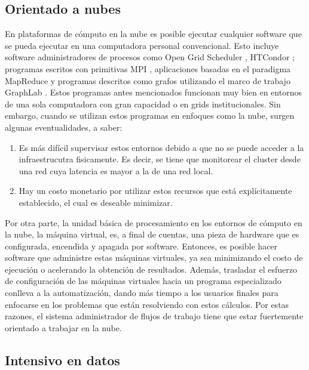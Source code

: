 \subsection{Orientado a nubes}

En plataformas de c\'omputo en la nube es posible ejecutar cualquier software que se pueda ejecutar en una computadora personal convencional. Esto incluye software administradores de procesos como Open Grid Scheduler \cite{univa2016gridengine}, HTCondor \cite{htcondor2014webpage}; programas escritos con primitivas MPI \cite{mpiforum2016mpi}, aplicaciones basadas en el paradigma MapReduce \cite{dean2008mapreduce} y programas descritos como grafos utilizando el marco de trabajo GraphLab \cite{low2014graphlab}. Estos programas antes mencionados funcionan muy bien en entornos de una sola computadora con gran capacidad o en grids institucionales. Sin embargo, cuando se utilizan estos programas en enfoques como la nube, surgen algunas eventualidades, a saber:

\begin{enumerate}
\item Es más difícil supervisar estos entornos debido a que no se puede acceder a la infraestrucutra fisicamente. Es decir, se tiene que monitorear el cluster desde una red cuya latencia es mayor a la de una red local. 

\item Hay un costo monetario por utilizar estos recursos que está explícitamente establecido, el cual es deseable minimizar. 
\end{enumerate}

Por otra parte, la unidad b\'asica de procesamiento en los entornos de c\'omputo en la nube, la m\'aquina virtual, es, a final de cuentas, una pieza de hardware que es configurada, encendida y apagada por software. Entonces, es posible hacer software que administre estas m\'aquinas virtuales, ya sea minimizando el costo de ejecuci\'on o acelerando la obtenci\'on de resultados. Adem\'as, trasladar el esfuerzo de configuraci\'on de las m\'aquinas virtuales hacia un programa especializado conlleva a la automatizaci\'on, dando m\'as tiempo a los usuarios finales para enfocarse en los problemas que est\'an resolviendo con estos c\'alculos. Por estas razones, el sistema administrador de flujos de trabajo tiene que estar fuertemente orientado a trabajar en la nube.


\subsection{Intensivo en datos}

